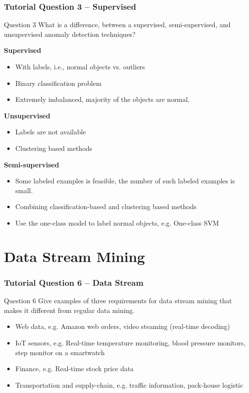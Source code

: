 \documentclass[aspectratio=169, 10pt]{beamer}
\begin{document}
\begin{frame}
    \frametitle{Tutorial Question 3 -- Supervised}
    \footnotesize 

    \begin{block}{Question 3}
        What is a difference, between a supervised, semi-supervised, and unsupervised anomaly detection techniques?
    \end{block}

    \textbf{Supervised}
    \begin{itemize}
        \item With labels, i.e., normal objects vs. outliers
        \item Binary classification problem
        \item Extremely imbalanced, majority of the objects are normal.
    \end{itemize}

    \textbf{Unsupervised}
    \begin{itemize}
        \item Labels are not available
        \item Clustering based methods
    \end{itemize}

    \textbf{Semi-supervised}
    \begin{itemize}
        \item Some labeled examples is feasible, the number of such labeled examples is small.
        \item Combining classification-based and clustering based methods
        \item Use the one-class model to label normal objects, e.g. One-class SVM
    \end{itemize}
\end{frame}

\section{Data Stream Mining}
\begin{frame}
    \frametitle{Tutorial Question 6 -- Data Stream}
    
    \begin{block}{Question 6}
        Give examples of three requirements for data stream mining that makes it different from regular data mining.
    \end{block}

    \begin{itemize}
        \item Web data, e.g. Amazon web orders, video steaming (real-time decoding)
        \item IoT sensors, e.g. Real-time temperature monitoring, blood pressure monitors, step monitor on a smartwatch
        \item Finance, e.g. Real-time stock price data
        \item Transportation and supply-chain, e.g. traffic information, pack-house logistic
    \end{itemize}
\end{frame}
\end{document}

